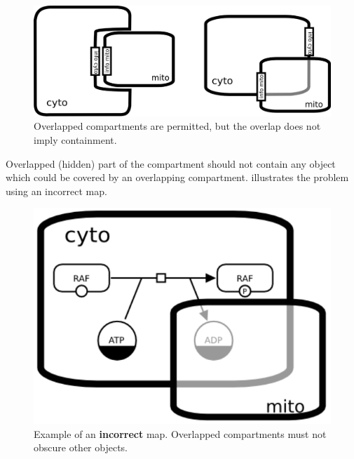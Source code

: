 \begin{figure}[H]
  \centering
  \includegraphics[scale = 0.4]{examples/compartment_overlapping}
  \caption{Overlapped compartments are permitted, but the overlap does not imply containment.}
  \label{fig:overlap}
\end{figure}

Overlapped (hidden) part of the compartment should not contain any object which could be covered by an overlapping compartment.   illustrates the problem using an incorrect map.

\begin{figure}[H]
  \centering
  \includegraphics[scale = 0.45]{examples/compartment_overlapping_wrong}
  \caption{Example of an \textbf{incorrect} map.  Overlapped compartments must not obscure other objects.}
  \label{fig:overlap-bad}
\end{figure}


